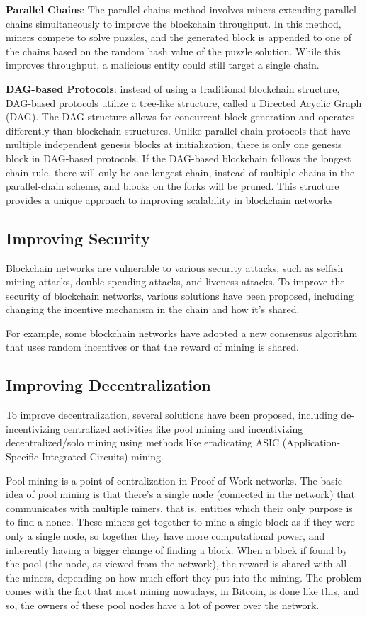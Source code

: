 \textbf{Parallel Chains}: The parallel chains method involves miners extending parallel chains simultaneously to improve the blockchain throughput. In this method, miners compete to solve puzzles, and the generated block is appended to one of the chains based on the random hash value of the puzzle solution. While this improves throughput, a malicious entity could still target a single chain.

\textbf{DAG-based Protocols}: instead of using a traditional blockchain structure, DAG-based protocols utilize a tree-like structure, called a Directed Acyclic Graph (DAG). The DAG structure allows for concurrent block generation and operates differently than blockchain structures. Unlike parallel-chain protocols that have multiple independent genesis blocks at initialization, there is only one genesis block in DAG-based protocols. If the DAG-based block\-chain follows the longest chain rule, there will only be one longest chain, instead of multiple chains in the parallel-chain scheme, and blocks on the forks will be pruned. This structure provides a unique approach to improving scalability in blockchain networks 

\subsection*{Improving Security}
Blockchain networks are vulnerable to various security attacks, such as selfish mining attacks, double-spending attacks, and liveness attacks. To improve the security of blockchain networks, various solutions have been proposed, including changing the incentive mechanism in the chain and how it's shared.

For example, some blockchain networks have adopted a new consensus algorithm that uses random incentives or that the reward of mining is shared.

\subsection*{Improving Decentralization}
To improve decentralization, several solutions have been proposed,
including de-incentivizing centralized activities 
like pool mining and incentivizing decentralized/solo mining using methods like eradicating ASIC (Application-Specific Integrated Circuits) mining.

Pool mining is a point of centralization in Proof of Work networks. The basic idea of pool mining is that there's a single node (connected in the network) that communicates with multiple miners, that is, entities which their only purpose is to find a nonce.
These miners get together to mine a single block as if they were only a single node, so together they have more computational power, and inherently having a bigger change of finding a block. When a block if found by the pool (the node, as viewed from the network), the reward is shared with all the miners, depending on how much effort they put into the mining.
The problem comes with the fact that most mining nowadays, in Bitcoin, is done like this, and so, the owners of these pool nodes have a lot of power over the network.

